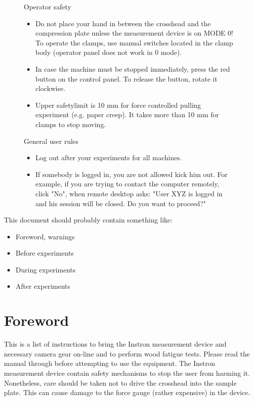 \documentclass[a4paper]{article}
\begin{document}
\begin{figure}[htb]
  \begin{minipage}[\textwidth]{\textwidth}
    {\color{red}
     {\Large Operator safety}
     \begin{itemize}
       \item Do not place your hand in between the crosshead and the compression plate unless the measurement device is on \textsf{MODE 0}! To operate the clamps, use manual switches located in the clamp body (operator panel does not work in 0 mode).
       \item In case the machine must be stopped immediately, press the red button on the control panel. To release the button, rotate it clockwise.
       \item Upper safetylimit is 10 mm for force controlled pulling experiment (e.g. paper creep). It takes more than 10 mm for clamps to stop moving.
     \end{itemize}

     {\Large General user rules}
     \begin{itemize}
       \item Log out after your experiments for all machines.
       \item If somebody is logged in, you are not allowed kick him out. For example, if you are trying to contact the computer remotely, click "No", when remote desktop asks: "User XYZ is logged in and his session will be closed. Do you want to proceed?"
     \end{itemize}
     }
  \end{minipage}
\end{figure}

\begin{framed}
This document should probably contain something like:
\begin{itemize}
  \item Foreword, warnings
  \item Before experiments
  \item During experiments
  \item After experiments
\end{itemize}
\end{framed}


\section{Foreword}

This is a list of instructions to bring the Instron measurement device
and necessary camera gear on-line and to perform wood fatigue
tests. Please read the manual through before attempting to use the
equipment. The Instron measurement device contain safety mechanisms to
stop the user from harming it. Nonetheless, care should be taken not
to drive the crosshead into the sample plate. This can cause damage to
the force gauge (rather expensive) in the device.
\end{document}
